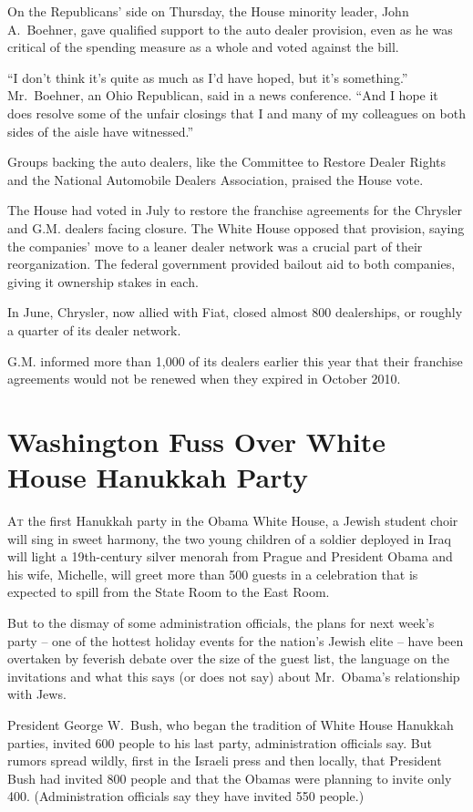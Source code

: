 ﻿\documentclass[12pt]{article}
\begin{document}
On the Republicans' side on Thursday, the House minority leader, John A.~Boehner, gave qualified
support to the auto dealer provision, even as he was critical of the spending measure as a whole and
voted against the bill.

``I don't think it's quite as much as I'd have hoped, but it's something.'' Mr.~Boehner, an Ohio
Republican, said in a news conference. ``And I hope it does resolve some of the unfair closings that
I and many of my colleagues on both sides of the aisle have witnessed.''

Groups backing the auto dealers, like the Committee to Restore Dealer Rights and the National
Automobile Dealers Association, praised the House vote.

The House had voted in July to restore the franchise agreements for the Chrysler and G.M. dealers
facing closure. The White House opposed that provision, saying the companies' move to a leaner
dealer network was a crucial part of their reorganization. The federal government provided bailout
aid to both companies, giving it ownership stakes in each.

In June, Chrysler, now allied with Fiat, closed almost 800 dealerships, or roughly a quarter of its
dealer network.

G.M. informed more than 1,000 of its dealers earlier this year that their franchise agreements would
not be renewed when they expired in October 2010.

\section{Washington Fuss Over White House Hanukkah Party}

\lettrine{A}{t} the first Hanukkah party in the Obama White House, a Jewish
student choir will sing in sweet harmony, the two young children of a soldier deployed in Iraq will
light a 19th-century silver menorah from Prague and President Obama and his wife, Michelle, will
greet more than 500 guests in a celebration that is expected to spill from the State Room to the
East Room.

But to the dismay of some administration officials, the plans for next week's party -- one of the
hottest holiday events for the nation's Jewish elite -- have been overtaken by feverish debate over
the size of the guest list, the language on the invitations and what this says (or does not say)
about Mr.~Obama's relationship with Jews.

President George W.~Bush, who began the tradition of White House Hanukkah parties, invited 600
people to his last party, administration officials say. But rumors spread wildly, first in the
Israeli press and then locally, that President Bush had invited 800 people and that the Obamas were
planning to invite only 400. (Administration officials say they have invited 550 people.)
\end{document}
